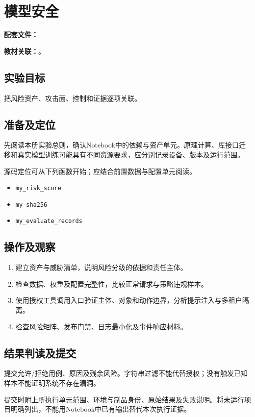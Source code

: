 \chapter{模型安全}
\label{lab:70_model_safety}

\noindent\textbf{配套文件：}\par
\noindent\textbf{教材关联：}。

\section*{实验目标}
把风险资产、攻击面、控制和证据逐项关联。

\section*{准备及定位}
先阅读本册实验总则，确认Notebook中的依赖与资产单元。原理计算、库接口迁移和真实模型训练可能具有不同资源要求，应分别记录设备、版本及运行范围。

源码定位可从下列函数开始；应结合前置数据与配置单元阅读。
\begin{itemize}
\item \texttt{my\_risk\_score}
\item \texttt{my\_sha256}
\item \texttt{my\_evaluate\_records}
\end{itemize}

\section*{操作及观察}
\begin{enumerate}
\item 建立资产与威胁清单，说明风险分级的依据和责任主体。
\item 检查数据、权重及配置完整性，比较正常请求与策略违规样本。
\item 使用授权工具调用入口验证主体、对象和动作边界，分析提示注入与多租户隔离。
\item 检查风险矩阵、发布门禁、日志最小化及事件响应材料。
\end{enumerate}

\section*{结果判读及提交}
提交允许/拒绝用例、原因及残余风险。字符串过滤不能代替授权；没有触发已知样本不能证明系统不存在漏洞。

提交时附上所执行单元范围、环境与制品身份、原始结果及失败说明。将未运行项目明确列出，不能用Notebook中已有输出替代本次执行证据。
